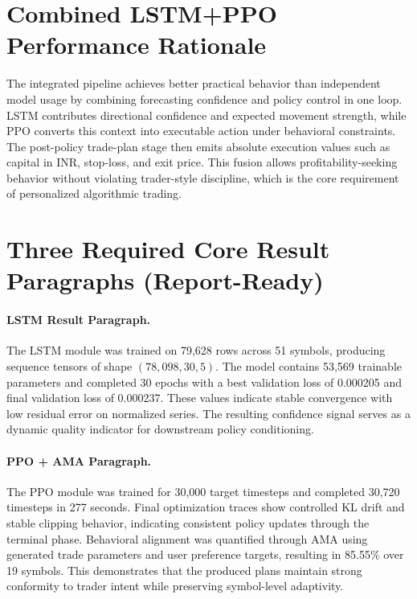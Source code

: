 \section{Combined LSTM+PPO Performance Rationale}

The integrated pipeline achieves better practical behavior than independent model usage by combining forecasting confidence and policy control in one loop. LSTM contributes directional confidence and expected movement strength, while PPO converts this context into executable action under behavioral constraints. The post-policy trade-plan stage then emits absolute execution values such as capital in INR, stop-loss, and exit price. This fusion allows profitability-seeking behavior without violating trader-style discipline, which is the core requirement of personalized algorithmic trading.

\section{Three Required Core Result Paragraphs (Report-Ready)}

\paragraph{LSTM Result Paragraph.}
The LSTM module was trained on 79,628 rows across 51 symbols, producing sequence tensors of shape \((78{,}098, 30, 5)\). The model contains 53,569 trainable parameters and completed 30 epochs with a best validation loss of 0.000205 and final validation loss of 0.000237. These values indicate stable convergence with low residual error on normalized series. The resulting confidence signal serves as a dynamic quality indicator for downstream policy conditioning.

\paragraph{PPO + AMA Paragraph.}
The PPO module was trained for 30,000 target timesteps and completed 30,720 timesteps in 277 seconds. Final optimization traces show controlled KL drift and stable clipping behavior, indicating consistent policy updates through the terminal phase. Behavioral alignment was quantified through AMA using generated trade parameters and user preference targets, resulting in 85.55\% over 19 symbols. This demonstrates that the produced plans maintain strong conformity to trader intent while preserving symbol-level adaptivity.


